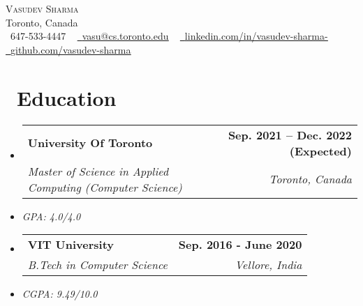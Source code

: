 \documentclass[letterpaper,11pt]{article}
\makeatletter
\newcommand{\resumeItem}[1]{
  \item\small{
    {#1 \vspace{-2pt}}
  }
}
\newcommand{\resumeSubheading}[4]{
  \vspace{-2pt}\item
    \begin{tabular*}{1.0\textwidth}[t]{l@{\extracolsep{\fill}}r}
      \textbf{#1} & \textbf{\small #2} \\
      \textit{\small#3} & \textit{\small #4} \\
    \end{tabular*}\vspace{-7pt}
}
\newcommand{\resumeSubSubheading}[2]{
    \item
    \begin{tabular*}{0.97\textwidth}{l@{\extracolsep{\fill}}r}
      \textit{\small#1} & \textit{\small #2} \\
    \end{tabular*}\vspace{-7pt}
}
\newcommand{\resumeSubHeadingListStart}{\begin{itemize}[leftmargin=0.0in, label={}]}
\newcommand{\resumeSubHeadingListEnd}{\end{itemize}}
\makeatother
\begin{document}
\begin{center}
    {\Huge \scshape Vasudev Sharma} \\ \vspace{1pt}
    Toronto, Canada \\ \vspace{1pt}
    \small \raisebox{-0.1\height}\faPhone\ 647-533-4447 ~ \href{mailto:vasu@cs.toronto.edu}{\raisebox{-0.2\height}\faEnvelope\  \underline{vasu@cs.toronto.edu}} ~ 
    \href{https://linkedin.com/in/vasudev-sharma-}{\raisebox{-0.2\height}\faLinkedin\ \underline{linkedin.com/in/vasudev-sharma-}}  ~
    \href{https://github.com/}{\raisebox{-0.2\height}\faGithub\ \underline{github.com/vasudev-sharma}}
    \vspace{-8pt}
\end{center}

\begin{comment}
    \section{Summary}
    An open source contributor with one 1-year experience as a Machine Learning Engineer
\end{comment}


\section{\faSchool \ Education}
  \resumeSubHeadingListStart
    \resumeSubheading
    {University Of Toronto}{Sep. 2021 -- Dec. 2022 (Expected)}
    {Master of Science in Applied Computing (Computer Science)}{Toronto, Canada}
    \resumeItem{\scriptsize \textit{GPA: 4.0/4.0}}
    \resumeSubheading
        {VIT University}{Sep. 2016 - June 2020}
        {B.Tech in Computer Science}{Vellore, India}
        \small\resumeItem{\scriptsize \textit{CGPA: 9.49/10.0} }
  \resumeSubHeadingListEnd

\end{document}

